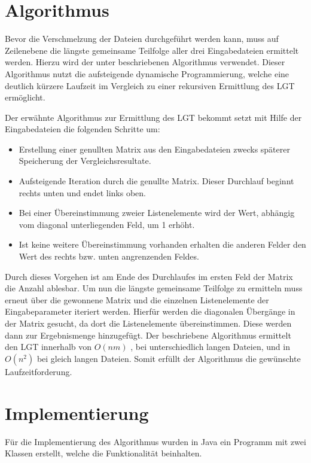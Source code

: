 \documentclass[a4paper,titlepage,12pt]{scrartcl}
\begin{document}
\section{Algorithmus}
\label{sec:algorithm}
Bevor die Verschmelzung der Dateien durchgeführt werden kann, muss auf Zeilenebene die längste gemeinsame Teilfolge aller drei Eingabedateien ermittelt werden.
Hierzu wird der unter \citet{www:EP96} beschriebenen Algorithmus verwendet. Dieser Algorithmus nutzt die aufsteigende dynamische Programmierung,
welche eine deutlich kürzere Laufzeit im Vergleich zu einer rekursiven Ermittlung des LGT ermöglicht.

Der erwähnte Algorithmus zur Ermittlung des LGT bekommt setzt mit Hilfe der Eingabedateien die folgenden Schritte um:

\begin{itemize}
\item Erstellung einer genullten Matrix aus den Eingabedateien zwecks späterer Speicherung der Vergleichsresultate.
\item Aufsteigende Iteration durch die genullte Matrix. Dieser Durchlauf beginnt rechts unten und endet links oben.
\item Bei einer Übereinstimmung zweier Listenelemente wird der Wert, abhängig vom diagonal unterliegenden Feld, um 1 erhöht.
\item Ist keine weitere Übereinstimmung vorhanden erhalten die anderen Felder den Wert des rechts bzw. unten angrenzenden Feldes.
\end{itemize}

Durch dieses Vorgehen ist am Ende des Durchlaufes im ersten Feld der Matrix die Anzahl ablesbar.
Um nun die längste gemeinsame Teilfolge zu ermitteln muss erneut über die gewonnene Matrix und die einzelnen Listenelemente der Eingabeparameter iteriert werden.
Hierfür werden die diagonalen Übergänge in der Matrix gesucht, da dort die Listenelemente übereinstimmen. Diese werden dann zur Ergebnismenge hinzugefügt.
Der beschriebene Algorithmus ermittelt den LGT innerhalb von $O(nm)$ , bei unterschiedlich langen Dateien, und in $O(n^2)$ bei gleich langen Dateien. Somit erfüllt der Algorithmus die gewünschte Laufzeitforderung.


\section{Implementierung}
\label{sec:implementation}
Für die Implementierung des Algorithmus wurden in Java ein Programm mit zwei Klassen erstellt, welche die Funktionalität beinhalten.
\end{document}
